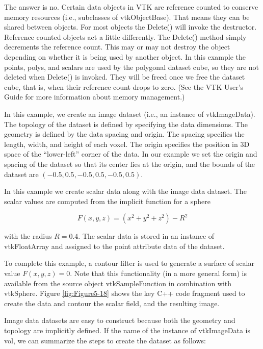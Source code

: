 \begin{description}[leftmargin=0cm,labelindent=0cm]
The answer is no. Certain data objects in VTK are reference counted to conserve memory resources (i.e., subclasses of vtkObjectBase). That means they can be shared between objects. For most objects the Delete() will invoke the destructor. Reference counted objects act a little differently. The Delete() method simply decrements the reference count. This may or may not destroy the object depending on whether it is being used by another object. In this example the points, polys, and scalars are used by the polygonal dataset cube, so they are not deleted when Delete() is invoked. They will be freed once we free the dataset cube, that is, when their reference count drops to zero. (See the VTK User's Guide for more information about memory management.)

\item[Create an Image Data Dataset.\index{image data!example|(}]

In this example, we create an image dataset (i.e., an instance of vtkImageData). The topology of the dataset is defined by specifying the data dimensions. The geometry is defined by the data spacing and origin. The spacing specifies the length, width, and height of each voxel. The origin specifies the position in 3D space of the ``lower-left'' corner of the data. In our example we set the origin and spacing of the dataset so that its center lies at the origin, and the bounds of the dataset are $(-0.5,0.5, -0.5,0.5, -0.5,0.5)$.

In this example we create scalar data along with the image data dataset. The scalar values are computed from the implicit function for a sphere

\begin{equation}\label{eq:5.2}
F(x,y,z) = (x^2 + y^2 + z^2)-R^2\end{equation}

with the radius $R = 0.4$. The scalar data is stored in an instance of vtkFloatArray and assigned to the point attribute data of the dataset.

To complete this example, a contour filter is used to generate a surface of scalar value $F(x, y, z) = 0$. Note that this functionality (in a more general form) is available from the source object vtkSampleFunction in combination with vtkSphere. Figure \ref{fig:Figure5-18} shows the key C++ code fragment used to create the data and contour the scalar field, and the resulting image.

Image data datasets are easy to construct because both the geometry and topology are implicitly defined. If the name of the instance of vtkImageData is vol, we can summarize the steps to create the dataset as follows:


\end{description}
